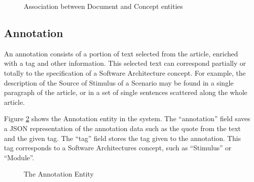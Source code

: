 \begin{figure}[h]
\centering
\renewcommand {\umltextcolor}{black}
\renewcommand {\umlfillcolor}{none}
\renewcommand {\umldrawcolor}{black}

\caption{Association between Document and Concept entities}
\label{figure:documentConcept}
\end{figure}

\subsection{Annotation}
\label{section:annotation}

An annotation consists of a portion of text selected from the article, enriched with a tag and other information. This selected text can correspond partially or totally to the specification of a Software Architecture concept. For example, the description of the Source of Stimulus of a Scenario may be found in a single paragraph of the article, or in a set of single sentences scattered along the whole article. 

Figure \ref{figure:annotationEntity} shows the Annotation entity in the system. The ``annotation'' field saves a JSON representation of the annotation data such as the quote from the text and the given tag. The ``tag'' field stores the tag given to the annotation. This tag corresponds to a Software Architectures concept, such as ``Stimulus'' or ``Module''.

\begin{figure}[h]
\centering
\renewcommand {\umltextcolor}{black}
\renewcommand {\umlfillcolor}{none}
\renewcommand {\umldrawcolor}{black}

\caption{The Annotation Entity}
\label{figure:annotationEntity}
\end{figure}

